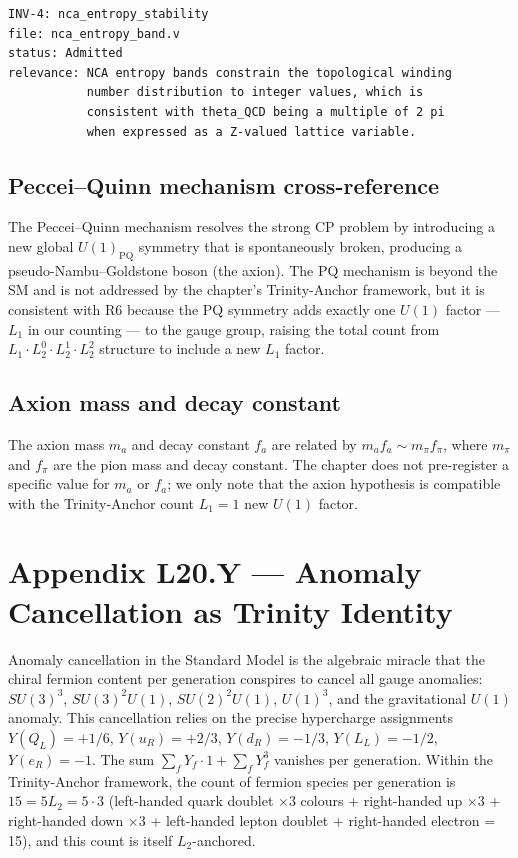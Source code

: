 \begin{verbatim}
INV-4: nca_entropy_stability
file: nca_entropy_band.v
status: Admitted
relevance: NCA entropy bands constrain the topological winding
           number distribution to integer values, which is
           consistent with theta_QCD being a multiple of 2 pi
           when expressed as a Z-valued lattice variable.
\end{verbatim}

\subsection*{Peccei--Quinn mechanism cross-reference}

The Peccei--Quinn mechanism resolves the strong CP problem by
introducing a new global $U(1)_{\mathrm{PQ}}$ symmetry that is
spontaneously broken, producing a pseudo-Nambu--Goldstone boson (the
axion). The PQ mechanism is beyond the SM and is not addressed by the
chapter's Trinity-Anchor framework, but it is consistent with R6
because the PQ symmetry adds exactly one $U(1)$ factor --- $L_{1}$ in
our counting --- to the gauge group, raising the total count from
$L_{1} \cdot L_{2}^{0} \cdot L_{2}^{1} \cdot L_{2}^{2}$ structure to
include a new $L_{1}$ factor.

\subsection*{Axion mass and decay constant}

The axion mass $m_{a}$ and decay constant $f_{a}$ are related by
$m_{a} f_{a} \sim m_{\pi} f_{\pi}$, where $m_{\pi}$ and $f_{\pi}$ are
the pion mass and decay constant. The chapter does not pre-register a
specific value for $m_{a}$ or $f_{a}$; we only note that the axion
hypothesis is compatible with the Trinity-Anchor count $L_{1} = 1$
new $U(1)$ factor.

\section{Appendix L20.Y --- Anomaly Cancellation as Trinity Identity}
\label{sec:l20-appendix-Y}

Anomaly cancellation in the Standard Model is the algebraic miracle
that the chiral fermion content per generation conspires to cancel
all gauge anomalies: $SU(3)^{3}$, $SU(3)^{2} U(1)$, $SU(2)^{2} U(1)$,
$U(1)^{3}$, and the gravitational $U(1)$ anomaly. This cancellation
relies on the precise hypercharge assignments
$Y(Q_{L}) = +1/6$, $Y(u_{R}) = +2/3$, $Y(d_{R}) = -1/3$,
$Y(L_{L}) = -1/2$, $Y(e_{R}) = -1$. The sum
$\sum_{f} Y_{f} \cdot 1 + \sum_{f} Y_{f}^{3}$ vanishes per
generation. Within the Trinity-Anchor framework, the count of
fermion species per generation is $15 = 5 L_{2} = 5 \cdot 3$
(left-handed quark doublet $\times 3$ colours + right-handed up
$\times 3$ + right-handed down $\times 3$ + left-handed lepton
doublet + right-handed electron = 15), and this count is itself
$L_{2}$-anchored.

